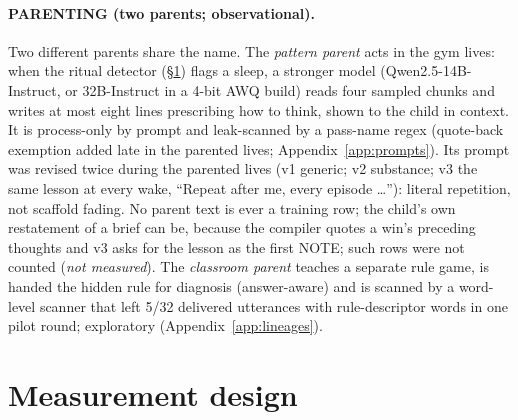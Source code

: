 \documentclass{article}
\newcommand{\nm}{\emph{not measured}}
\begin{document}
\paragraph{PARENTING (two parents; observational).} Two different parents share the name. The \emph{pattern parent} acts in the gym lives: when the ritual detector (\S\ref{sec:measure}) flags a sleep, a stronger model (Qwen2.5-14B-Instruct, or 32B-Instruct in a 4-bit AWQ build) reads four sampled chunks and writes at most eight lines prescribing how to think, shown to the child in context. It is process-only by prompt and leak-scanned by a pass-name regex (quote-back exemption added late in the parented lives; Appendix~\ref{app:prompts}). Its prompt was revised twice during the parented lives (v1 generic; v2 substance; v3 the same lesson at every wake, ``Repeat after me, every episode \ldots''): literal repetition, not scaffold fading. No parent text is ever a training row; the child's own restatement of a brief can be, because the compiler quotes a win's preceding thoughts and v3 asks for the lesson as the first NOTE; such rows were not counted (\nm). The \emph{classroom parent} teaches a separate rule game, is handed the hidden rule for diagnosis (answer-aware) and is scanned by a word-level scanner that left 5/32 delivered utterances with rule-descriptor words in one pilot round; exploratory (Appendix~\ref{app:lineages}).


\section{Measurement design}
\label{sec:measure}
\end{document}
